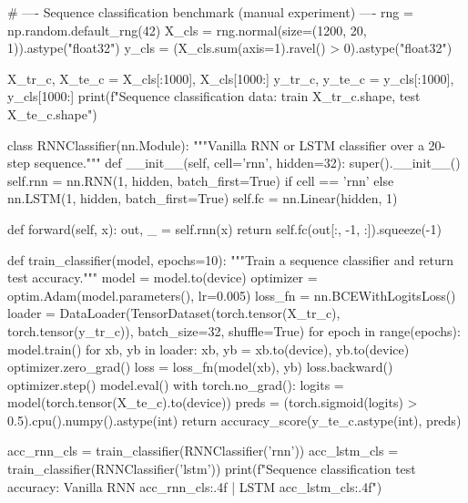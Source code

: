 \begin{codebox}[title={Sequence classification benchmark (manual experiment)}]
# ---- Sequence classification benchmark (manual experiment) ----
rng = np.random.default_rng(42)
X_cls = rng.normal(size=(1200, 20, 1)).astype("float32")
y_cls = (X_cls.sum(axis=1).ravel() > 0).astype("float32")

X_tr_c, X_te_c = X_cls[:1000], X_cls[1000:]
y_tr_c, y_te_c = y_cls[:1000], y_cls[1000:]
print(f"Sequence classification data: train {X_tr_c.shape}, test {X_te_c.shape}")

class RNNClassifier(nn.Module):
    """Vanilla RNN or LSTM classifier over a 20-step sequence."""
    def __init__(self, cell='rnn', hidden=32):
        super().__init__()
        self.rnn = nn.RNN(1, hidden, batch_first=True) if cell == 'rnn' else nn.LSTM(1, hidden, batch_first=True)
        self.fc = nn.Linear(hidden, 1)

    def forward(self, x):
        out, _ = self.rnn(x)
        return self.fc(out[:, -1, :]).squeeze(-1)

def train_classifier(model, epochs=10):
    """Train a sequence classifier and return test accuracy."""
    model = model.to(device)
    optimizer = optim.Adam(model.parameters(), lr=0.005)
    loss_fn = nn.BCEWithLogitsLoss()
    loader = DataLoader(TensorDataset(torch.tensor(X_tr_c), torch.tensor(y_tr_c)), batch_size=32, shuffle=True)
    for epoch in range(epochs):
        model.train()
        for xb, yb in loader:
            xb, yb = xb.to(device), yb.to(device)
            optimizer.zero_grad()
            loss = loss_fn(model(xb), yb)
            loss.backward()
            optimizer.step()
    model.eval()
    with torch.no_grad():
        logits = model(torch.tensor(X_te_c).to(device))
        preds = (torch.sigmoid(logits) > 0.5).cpu().numpy().astype(int)
    return accuracy_score(y_te_c.astype(int), preds)

acc_rnn_cls = train_classifier(RNNClassifier('rnn'))
acc_lstm_cls = train_classifier(RNNClassifier('lstm'))
print(f"Sequence classification test accuracy: Vanilla RNN {acc_rnn_cls:.4f} | LSTM {acc_lstm_cls:.4f}")
\end{codebox}
